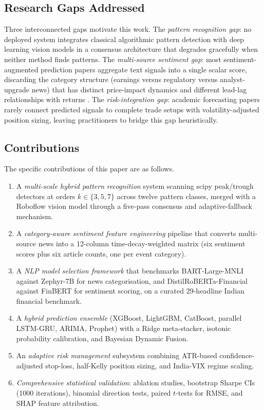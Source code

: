 \documentclass[ASNA,twocolumn]{USG}
\begin{document}
\subsection{Research Gaps Addressed}

Three interconnected gaps motivate this work. The \emph{pattern recognition gap}:
no deployed system integrates classical algorithmic pattern detection with deep
learning vision models in a consensus architecture that degrades gracefully when
neither method finds patterns. The \emph{multi-source sentiment gap}: most
sentiment-augmented prediction papers aggregate text signals into a single scalar
score, discarding the category structure (earnings versus regulatory versus
analyst-upgrade news) that has distinct price-impact dynamics and different
lead-lag relationships with returns \citep{ding2015}. The \emph{risk-integration
gap}: academic forecasting papers rarely connect predicted signals to complete
trade setups with volatility-adjusted position sizing, leaving practitioners to
bridge this gap heuristically.

\subsection{Contributions}

The specific contributions of this paper are as follows.

\begin{enumerate}[label=\arabic*., leftmargin=*, noitemsep]
  \item A \emph{multi-scale hybrid pattern recognition} system scanning
    scipy peak/trough detectors at orders $k \in \{3, 5, 7\}$ across twelve
    pattern classes, merged with a Roboflow vision model through a five-pass
    consensus and adaptive-fallback mechanism.
  \item A \emph{category-aware sentiment feature engineering} pipeline
    that converts multi-source news into a 12-column time-decay-weighted matrix
    (six sentiment scores plus six article counts, one per event category).
  \item A \emph{NLP model selection framework} that benchmarks
    BART-Large-MNLI against Zephyr-7B for news categorisation, and
    DistilRoBERTa-Financial against FinBERT for sentiment scoring, on a
    curated 29-headline Indian financial benchmark.
  \item A \emph{hybrid prediction ensemble} (XGBoost, LightGBM, CatBoost,
    parallel LSTM-GRU, ARIMA, Prophet) with a Ridge meta-stacker,
    isotonic probability calibration, and Bayesian Dynamic Fusion.
  \item An \emph{adaptive risk management} subsystem combining ATR-based
    confidence-adjusted stop-loss, half-Kelly position sizing, and India-VIX
    regime scaling.
  \item \emph{Comprehensive statistical validation}: ablation studies,
    bootstrap Sharpe CIs (1000 iterations), binomial direction tests,
    paired $t$-tests for RMSE, and SHAP feature attribution.
\end{enumerate}
\end{document}
